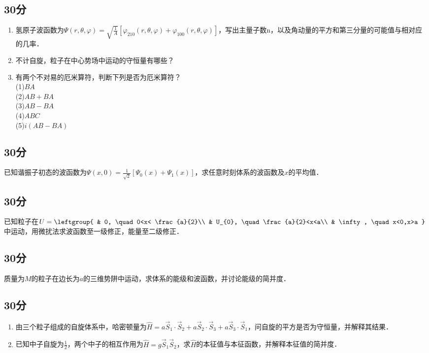 
\subsection{30分}
\begin{enumerate}
\item 氢原子波函数为$\varPsi (r,\theta,\varphi)=\sqrt{\frac{1}{A}}[\varphi_{210}(r,\theta,\varphi)+\varphi_{100}(r,\theta,\varphi)]$，写出主量子数n，以及角动量的平方和第三分量的可能值与相对应的几率．
\item 不计自旋，粒子在中心势场中运动的守恒量有哪些？
\item 有两个不对易的厄米算符，判断下列是否为厄米算符？\\
(1)$BA$\\(2)$AB+BA$\\(3)$AB-BA$\\(4)$ABC$\\(5)$i(AB-BA)$
\end{enumerate}
\subsection{30分}
已知谐振子初态的波函数为$\varPsi(x,0)=\frac{1}{\sqrt{2}}[\varPsi_{0}(x)+\varPsi_{1}(x)]$，求任意时刻体系的波函数及$x$的平均值．
\subsection{30分}
已知粒子在$U=\leftgroup{
    & 0, \quad 0<x< \frac{a}{2}\\
    & U_{0}, \quad \frac{a}{2}<x<a\\
    & \infty, \quad x<0,x>a
}$中运动，用微扰法求波函数至一级修正，能量至二级修正．
\subsection{30分}
质量为$M$的粒子在边长为$a$的三维势阱中运动，求体系的能级和波函数，并讨论能级的简并度．
\subsection{30分}
\begin{enumerate}
\item 由三个粒子组成的自旋体系中，哈密顿量为$\hat {H}=a\vec{S}_1\cdot\vec{S}_2+a\vec{S}_2\cdot\vec{S}_3+a\vec{S}_3\cdot\vec{S}_1$，问自旋的平方是否为守恒量，并解释其结果．
\item 已知中子自旋为$\frac{1}{2}$，两个中子的相互作用为$\hat {H}=g\vec{S}_1\vec{S}_2$，求$\hat {H}$的本征值与本征函数，并解释本征值的简并度．
\end{enumerate}
